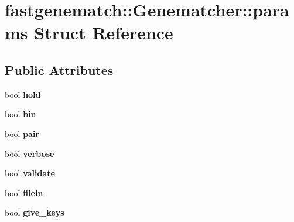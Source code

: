 \hypertarget{structfastgenematch_1_1Genematcher_1_1params}{
\section{fastgenematch::Genematcher::params Struct Reference}
\label{structfastgenematch_1_1Genematcher_1_1params}
}
\subsection*{Public Attributes}
\begin{DoxyCompactItemize}
\item 
\hypertarget{structfastgenematch_1_1Genematcher_1_1params_afe18ab3df28ac792ceafd23c762e60e9}{
bool {\bfseries hold}}
\label{structfastgenematch_1_1Genematcher_1_1params_afe18ab3df28ac792ceafd23c762e60e9}

\item 
\hypertarget{structfastgenematch_1_1Genematcher_1_1params_af71f71258871265c22ee2926c62c8e44}{
bool {\bfseries bin}}
\label{structfastgenematch_1_1Genematcher_1_1params_af71f71258871265c22ee2926c62c8e44}

\item 
\hypertarget{structfastgenematch_1_1Genematcher_1_1params_a592916e8189b43e5e48eb6ecbf8a5c4f}{
bool {\bfseries pair}}
\label{structfastgenematch_1_1Genematcher_1_1params_a592916e8189b43e5e48eb6ecbf8a5c4f}

\item 
\hypertarget{structfastgenematch_1_1Genematcher_1_1params_a4ca5d6d173f9f68ef45c6a5da14ce02c}{
bool {\bfseries verbose}}
\label{structfastgenematch_1_1Genematcher_1_1params_a4ca5d6d173f9f68ef45c6a5da14ce02c}

\item 
\hypertarget{structfastgenematch_1_1Genematcher_1_1params_a70798746749ae929cda854f45eb7d495}{
bool {\bfseries validate}}
\label{structfastgenematch_1_1Genematcher_1_1params_a70798746749ae929cda854f45eb7d495}

\item 
\hypertarget{structfastgenematch_1_1Genematcher_1_1params_a6d9a31d418eb6714c47e4593dcab2063}{
bool {\bfseries filein}}
\label{structfastgenematch_1_1Genematcher_1_1params_a6d9a31d418eb6714c47e4593dcab2063}

\item 
\hypertarget{structfastgenematch_1_1Genematcher_1_1params_ad87dee81e835b9541de62f7db968cd1c}{
bool {\bfseries give\_\-keys}}
\label{structfastgenematch_1_1Genematcher_1_1params_ad87dee81e835b9541de62f7db968cd1c}


\end{DoxyCompactItemize}
